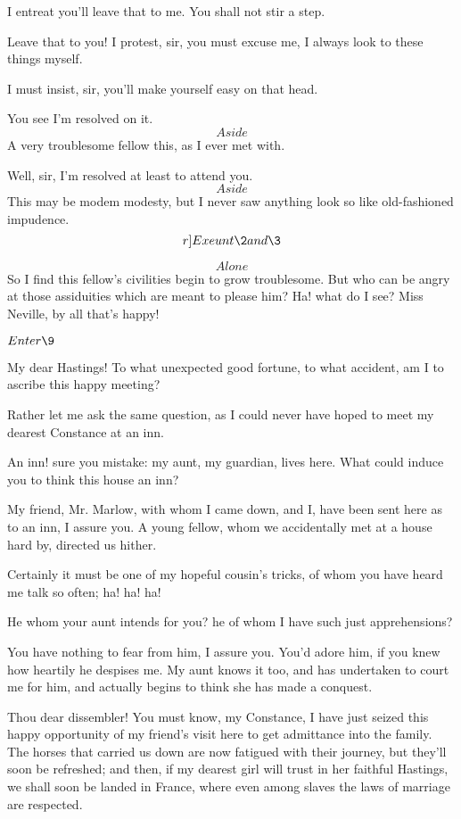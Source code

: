 \documentclass{book}
\begin{document}
\3  I entreat you'll leave that to me.  You shall not stir a
step.

\2  Leave that to you!  I protest, sir, you must excuse me, I
always look to these things myself.

\3  I must insist, sir, you'll make yourself easy on that
head.

\2  You see I'm resolved on it.  \[Aside\]  A very troublesome
fellow this, as I ever met with.

\3  Well, sir, I'm resolved at least to attend you.  \[Aside\] 
This may be modem modesty, but I never saw anything look so like
old-fashioned impudence.  \[r]Exeunt \2 and \3\]

\4  \[Alone\]  So I find this fellow's civilities begin to grow
troublesome.  But who can be angry at those assiduities which are meant
to please him?  Ha! what do I see?  Miss Neville, by all that's happy!


\(Enter \9\)


\9  My dear Hastings!  To what unexpected good fortune, to
what accident, am I to ascribe this happy meeting?

\4  Rather let me ask the same question, as I could never have
hoped to meet my dearest Constance at an inn.

\9  An inn! sure you mistake: my aunt, my guardian, lives
here.  What could induce you to think this house an inn?

\4  My friend, Mr. Marlow, with whom I came down, and I, have
been sent here as to an inn, I assure you.  A young fellow, whom we
accidentally met at a house hard by, directed us hither.

\9  Certainly it must be one of my hopeful cousin's tricks,
of whom you have heard me talk so often; ha! ha! ha!

\4  He whom your aunt intends for you? he of whom I have such
just apprehensions?

\9  You have nothing to fear from him, I assure you.  You'd
adore him, if you knew how heartily he despises me.  My aunt knows it
too, and has undertaken to court me for him, and actually begins to
think she has made a conquest.

\4  Thou dear dissembler!  You must know, my Constance, I have
just seized this happy opportunity of my friend's visit here to get
admittance into the family.  The horses that carried us down are now
fatigued with their journey, but they'll soon be refreshed; and then,
if my dearest girl will trust in her faithful Hastings, we shall soon
be landed in France, where even among slaves the laws of marriage are
respected.
\end{document}
